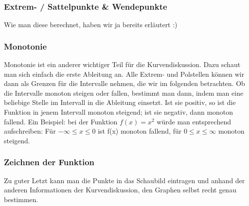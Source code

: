 
	\subsubsection{Extrem- / Sattelpunkte \& Wendepunkte}
		Wie man diese berechnet, haben wir ja bereits erläutert :)

	\subsubsection{Monotonie}
		Monotonie ist ein anderer wichtiger Teil für die Kurvendiskussion. Dazu schaut
		man sich einfach die erste Ableitung an. Alle Extrem- und Polstellen können
		wir dann als Grenzen für die Intervalle nehmen, die wir im folgenden
		betrachten. Ob die Intervalle monoton steigen oder fallen, bestimmt man dann,
		indem man eine beliebige Stelle im Intervall in die Ableitung einsetzt. Ist
		sie positiv, so ist die Funktion in jenem Intervall monoton steigend; ist sie
		negativ, dann monoton fallend. Ein Beispiel: bei der Funktion \(f(x)=x^2\)
		würde man entsprechend aufschreiben: Für \(-\infty \le x \le 0\) ist f(x)
		monoton fallend, für \(0\le x\le \infty\) monoton steigend.
		

\subsubsection{Zeichnen der Funktion}
	Zu guter Letzt kann man die Punkte in das Schaubild eintragen und anhand der
	anderen Informationen der Kurvendiskussion, den Graphen selbst recht genau
	bestimmen.


